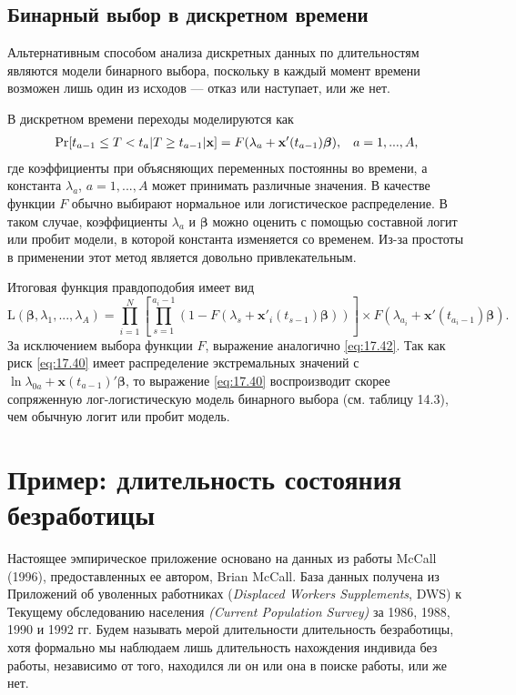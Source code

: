 \subsection{Бинарный выбор в дискретном времени}\label{sec:17.10.3}

\noindent
Альтернативным способом анализа дискретных данных по длительностям являются модели бинарного выбора, поскольку в каждый момент времени возможен лишь один из исходов --- отказ или наступает, или же нет.

В дискретном времени переходы моделируются как
        \begin{align}
        \label{eq:17.45}
        \mathrm{Pr}[t_{a-1}\le T<t_a|T\ge t_{a-1}|\mathbf{x}]=F(\lambda_a+\mathbf{x}'(t_{a-1})\bm{\beta}), \hspace{0.3cm} a=1,...,A,
        \end{align}
где коэффициенты при объясняющих переменных постоянны во времени, а константа $\lambda_a$, $a=1,...,A$ может принимать различные значения. В качестве функции $F$ обычно выбирают нормальное или логистическое распределение. В таком случае, коэффициенты $\lambda_a$ и $\bm{\beta}$ можно оценить с помощью составной логит или пробит модели, в которой константа изменяется со временем. Из-за простоты в применении этот метод является довольно привлекательным.

Итоговая функция правдоподобия имеет вид
        $$\mathrm{L}(\bm{\beta},\lambda_1,...,\lambda_A)=\prod^{N}_{i=1}\left[\prod^{a_i-1}_{s=1}(1-F\left(\lambda_s+\mathbf{x}'_i(t_{s-1})\bm{\beta}\right))\right]\times F\left(\lambda_{a_i}+\mathbf{x}'(t_{a_i-1})\bm{\beta}\right).$$
За исключением выбора функции $F$, выражение аналогично \ref{eq:17.42}. Так как риск \ref{eq:17.40} имеет распределение экстремальных значений с $\ln\lambda_{0a}+\mathbf{x}(t_{a-1})'\bm{\beta}$, то выражение \ref{eq:17.40} воспроизводит скорее сопряженную лог-логистическую модель бинарного выбора %
(см. таблицу 14.3), %
чем обычную логит или пробит модель.


\section{Пример: длительность состояния безработицы}\label{sec:17.11}

\noindent
Настоящее эмпирическое приложение основано на данных из работы McCall (1996), %
предоставленных ее автором, Brian McCall. База данных получена из Приложений об уволенных работниках (\textit{Displaced Workers Supplements}, DWS) %
к Текущему обследованию населения \textit{(Current Population Survey)} за 1986, 1988, 1990 и 1992 гг. Будем называть мерой длительности длительность безработицы, хотя формально мы наблюдаем лишь длительность нахождения индивида без работы, независимо от того, находился ли он или она в поиске работы, или же нет.

